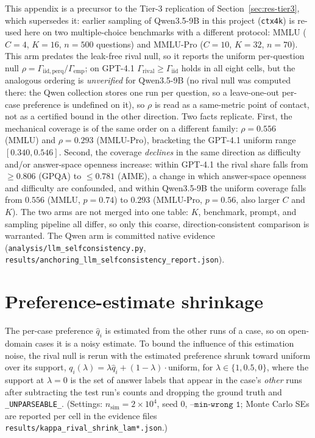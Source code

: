 \documentclass[a4paper,fleqn]{cas-sc}
\newcommand{\agreementIndex}{\Gamma}
\begin{document}
This appendix is a precursor to the Tier-3 replication of
Section~\ref{sec:res-tier3}, which supersedes it: earlier sampling of
Qwen3.5-9B in this project (\texttt{ctx4k}) is re-used here
on two multiple-choice benchmarks with a different
protocol: MMLU ($C=4$, $K=16$, $n=500$ questions) and MMLU-Pro ($C=10$,
$K=32$, $n=70$). This arm predates the leak-free rival null, so it
reports the uniform per-question null $\rho=\agreementIndex_{\mathrm{iid,perq}}/
\agreementIndex_{\mathrm{emp}}$; on GPT-4.1 $\agreementIndex_{\mathrm{rival}}\ge
\agreementIndex_{\mathrm{iid}}$ holds in all eight cells, but the analogous
ordering is \emph{unverified} for Qwen3.5-9B (no rival null was computed
there: the Qwen collection stores one run per question, so a
leave-one-out per-case preference is undefined on it), so $\rho$ is read
as a same-metric point of contact, not as a
certified bound in the other direction. Two facts replicate. First, the mechanical coverage is of
the same order on a
different family: $\rho=0.556$ (MMLU) and $\rho=0.293$ (MMLU-Pro),
bracketing the GPT-4.1 uniform range $[0.340,0.546]$. Second, the coverage
\emph{declines} in the same direction as difficulty and/or answer-space
openness increase: within GPT-4.1 the rival share falls from
$\ge0.806$ (GPQA) to $\le0.781$ (AIME), a change in which answer-space
openness and difficulty are confounded, and within Qwen3.5-9B the
uniform coverage falls from $0.556$ (MMLU, $p=0.74$) to $0.293$ (MMLU-Pro,
$p=0.56$, also larger $C$ and $K$). The two arms are not merged into one table: $K$, benchmark, prompt, and sampling pipeline all differ, so only
this coarse, direction-consistent comparison is warranted. The Qwen arm
is committed native evidence (\texttt{analysis/llm\_selfconsistency.py},
\texttt{results/anchoring\_llm\_selfconsistency\_report.json}).

\section{Preference-estimate shrinkage}
\label{app:shrink}

The per-case preference $\hat q_i$ is estimated from the other runs of a
case, so on open-domain cases it is a noisy estimate. To bound the
influence of this estimation noise, the rival null is rerun with the
estimated preference shrunk toward uniform over its support,
$q_i(\lambda)=\lambda\hat q_i+(1-\lambda)\cdot\mathrm{uniform}$, for
$\lambda\in\{1,0.5,0\}$, where the support at $\lambda=0$ is the set of
answer labels that appear in the case's \emph{other} runs after
subtracting the test run's counts and dropping the ground truth and
\texttt{\_UNPARSEABLE\_}. (Settings: $n_{\mathrm{sim}}=2\times10^4$,
seed 0, $\texttt{--min-wrong 1}$; Monte Carlo SEs are reported per cell
in the evidence files \texttt{results/kappa\_rival\_shrink\_lam*.json}.)
\end{document}
